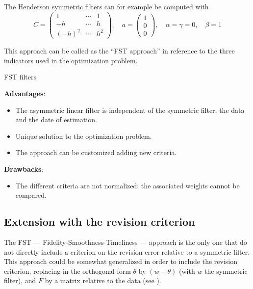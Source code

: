 \documentclass[
  12pt,
  ,
  a4paper]{article}
\providecommand{\tightlist}{%
  \setlength{\itemsep}{0pt}\setlength{\parskip}{0pt}}
\newcommand\1{\mathds{1}}
\begin{document}
The Henderson symmetric filters can for example be computed with
\[C=\begin{pmatrix}
1 & \cdots&1\\
-h & \cdots&h \\
(-h)^2 & \cdots&h^2
\end{pmatrix},\quad
a=\begin{pmatrix}
1 \\0\\0
\end{pmatrix},\quad
\alpha=\gamma=0,\quad
\beta=1\]

This approach can be called as the ``FST approach'' in reference to the three indicators used in the optimization problem.

\begin{summary}{FST filters}

\textbf{Advantages}:

\begin{itemize}
\item
  The asymmetric linear filter is independent of the symmetric filter, the data and the date of estimation.
\item
  Unique solution to the optimization problem.
\item
  The approach can be customized adding new criteria.
\end{itemize}

\textbf{Drawbacks}:

\begin{itemize}
\tightlist
\item
  The different criteria are not normalized: the associated weights cannot be compared.
\end{itemize}

\end{summary}

\hypertarget{extension-with-the-revision-criterion}{%
\subsection{Extension with the revision criterion}\label{extension-with-the-revision-criterion}}

The FST --- Fidelity-Smoothness-Timeliness --- approach is the only one that do not directly include a criterion on the revision error relative to a symmetric filter.\\
This approach could be somewhat generalized in order to include the revision criterion, replacing in the orthogonal form \(\theta\) by \((w-\theta)\) (with \(w\) the symmetric filter), and \(F\) by a matrix relative to the data (see \textcite{ch12HBSA}).
\end{document}
